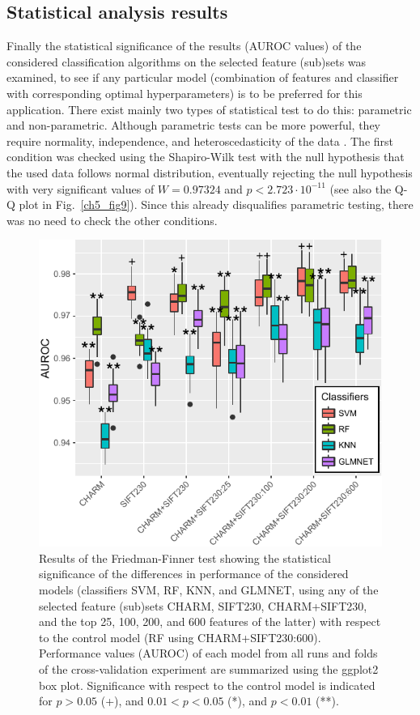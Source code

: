 \subsection{Statistical analysis results}
\label{subsec:experimentalAnalysis}
Finally the statistical significance of the results (AUROC values) of the considered classification algorithms on the selected feature (sub)sets was examined, to see if any particular model (combination of features and classifier with corresponding optimal hyperparameters) is to be preferred for this application. There exist mainly two types of statistical test to do this: parametric and non-parametric. Although parametric tests can be more powerful, they require normality, independence, and heteroscedasticity of the data \cite{fernandez2016methodology}. The first condition was checked using the Shapiro-Wilk test \cite{shapiro1965analysis} with the null hypothesis that the used data follows normal distribution, eventually rejecting the null hypothesis with very significant values of $W = 0.97324$ and $p < 2.723 \cdot 10^{-11}$ (see also the Q-Q plot in Fig.~\ref{ch5_fig9}). Since this already disqualifies parametric testing, there was no need to check the other conditions.
\begin{figure}[h!]
	\centering
	\includegraphics[width=0.65\columnwidth]{fig10}
	\caption{Results of the Friedman-Finner test showing the statistical significance of the differences in performance of the considered models (classifiers SVM, RF, KNN, and GLMNET, using any of the selected feature (sub)sets CHARM, SIFT230, CHARM+SIFT230, and the top 25, 100, 200, and 600 features of the latter) with respect to the control model (RF using CHARM+SIFT230:600). Performance values (AUROC) of each model from all runs and folds of the cross-validation experiment are summarized using the ggplot2 box plot. Significance with respect to the control model is indicated for $p > 0.05$ (+), and $0.01 < p < 0.05$ (*), and $p < 0.01$ (**).}
	\label{ch5_fig10}
\end{figure}
